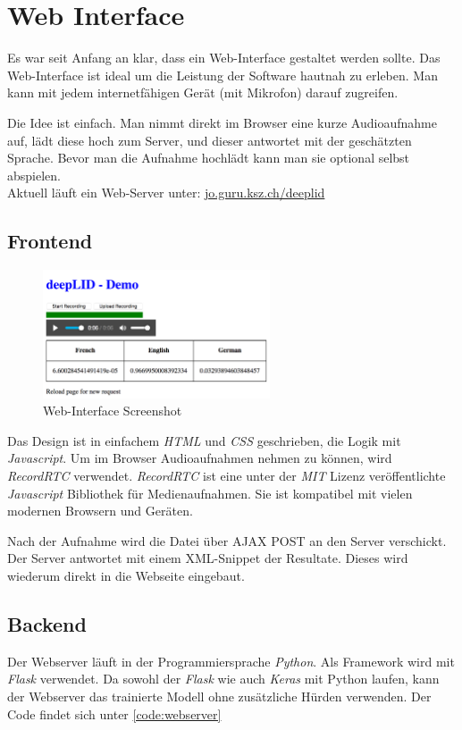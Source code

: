 \section{Web Interface}
Es war seit Anfang an klar, dass ein Web-Interface gestaltet werden sollte. Das Web-Interface ist ideal um die Leistung der Software hautnah zu erleben. Man kann mit jedem internetfähigen Gerät (mit Mikrofon) darauf zugreifen.

Die Idee ist einfach. Man nimmt direkt im Browser eine kurze Audioaufnahme auf, lädt diese hoch zum Server, und dieser antwortet mit der geschätzten Sprache. Bevor man die Aufnahme hochlädt kann man sie optional selbst abspielen.
\\ Aktuell läuft ein Web-Server unter: \url{jo.guru.ksz.ch/deeplid}


\subsection{Frontend}
\begin{figure}[hbt]
	\centering
		\includegraphics[width=0.6\textwidth]{assets/interface.png}
	\caption{Web-Interface Screenshot}
	\label{img:interface}
\end{figure}
Das Design ist in einfachem \textit{HTML} und \textit{CSS} geschrieben, die Logik mit \textit{Javascript}. Um im Browser Audioaufnahmen nehmen zu können, wird \textit{RecordRTC}\cite{recordrtc} verwendet. \textit{RecordRTC} ist eine unter der \textit{MIT} Lizenz veröffentlichte \textit{Javascript} Bibliothek für Medienaufnahmen. Sie ist kompatibel mit vielen modernen Browsern und Geräten.

Nach der Aufnahme wird die Datei über AJAX POST an den Server verschickt. Der Server antwortet mit einem XML-Snippet der Resultate.
Dieses wird wiederum direkt in die Webseite eingebaut.


\subsection{Backend}
Der Webserver läuft in der Programmiersprache \textit{Python}. Als Framework wird mit \textit{Flask}\cite{flask} verwendet. Da sowohl der \textit{Flask} wie auch \textit{Keras} mit Python laufen, kann der Webserver das trainierte Modell ohne zusätzliche Hürden verwenden.
Der Code findet sich unter \ref{code:webserver}
